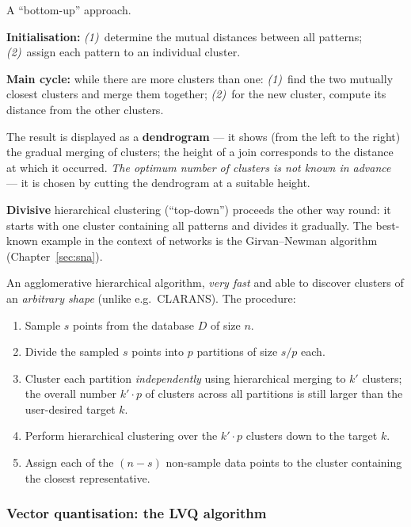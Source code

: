 \documentclass[11pt,a4paper]{article}
\theoremstyle{definition}
\providecommand{\uv}[1]{``#1''}
\begin{document}
\begin{defbox}
A \uv{bottom-up} approach.

\textbf{Initialisation:} \emph{(1)}~determine the mutual distances between all patterns;
\emph{(2)}~assign each pattern to an individual cluster.

\textbf{Main cycle:} while there are more clusters than one: \emph{(1)}~find the two mutually
closest clusters and merge them together; \emph{(2)}~for the new cluster, compute its distance from
the other clusters.

The result is displayed as a \textbf{dendrogram} --- it shows (from the left to the right) the
gradual merging of clusters; the height of a join corresponds to the distance at which it occurred.
\emph{The optimum number of clusters is not known in advance} --- it is chosen by cutting the
dendrogram at a suitable height.
\end{defbox}

\textbf{Divisive} hierarchical clustering (\uv{top-down}) proceeds the other way round: it starts
with one cluster containing all patterns and divides it gradually. The best-known example in the
context of networks is the Girvan--Newman algorithm (Chapter~\ref{sec:sna}).

\begin{defbox}
An agglomerative hierarchical algorithm, \emph{very fast} and able to discover clusters of an
\emph{arbitrary shape} (unlike e.g.\ CLARANS). The procedure:
\begin{enumerate}
\item Sample $s$ points from the database $D$ of size $n$.
\item Divide the sampled $s$ points into $p$ partitions of size $s/p$ each.
\item Cluster each partition \emph{independently} using hierarchical merging to $k'$ clusters; the
      overall number $k'\cdot p$ of clusters across all partitions is still larger than the
      user-desired target $k$.
\item Perform hierarchical clustering over the $k'\cdot p$ clusters down to the target $k$.
\item Assign each of the $(n-s)$ non-sample data points to the cluster containing the closest
      representative.
\end{enumerate}
\end{defbox}

\subsubsection{Vector quantisation: the LVQ algorithm}
\end{document}
